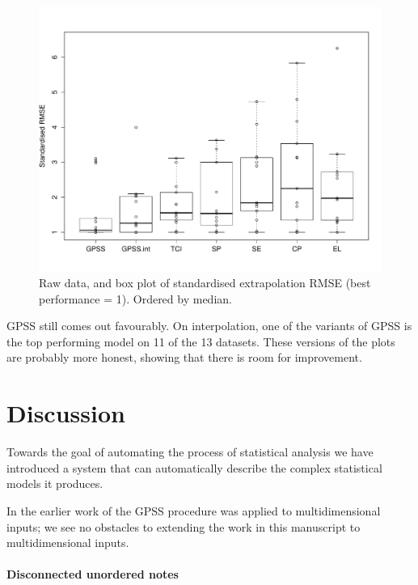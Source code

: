 \documentclass{article}
\begin{document}
\begin{figure}[h]
\centering
\includegraphics[width=\columnwidth]{figures/box_extrap_dist}
\caption{
Raw data, and box plot of standardised extrapolation RMSE (best performance = 1).
Ordered by median.
}
\label{fig:box_extrap_dist}
\end{figure}

GPSS still comes out favourably.
On interpolation, one of the variants of GPSS is the top performing model on 11 of the 13 datasets.
These versions of the plots are probably more honest, showing that there is room for improvement.











\section{Discussion}


Towards the goal of automating the process of statistical analysis we have introduced a system that can automatically describe the complex statistical models it produces.

In the earlier work of \cite{DuvLloGroetal13} the GPSS procedure was applied to multidimensional inputs; we see no obstacles to extending the work in this manuscript to multidimensional inputs.

\paragraph{Disconnected unordered notes}
\end{document}
